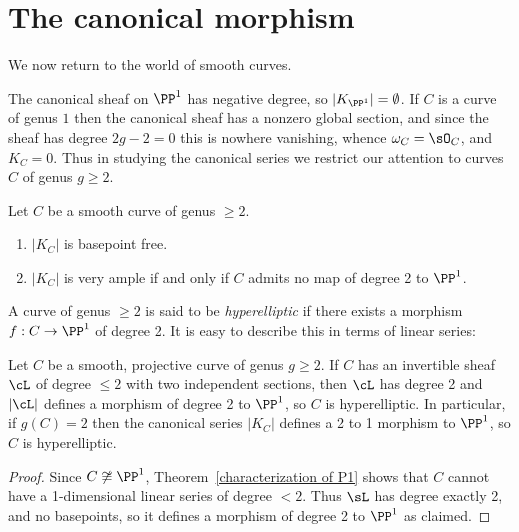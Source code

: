 \section{The canonical morphism}

We now return to the world of smooth curves.

 The canonical sheaf on $\PP^1$ has negative degree, so $|K_{\PP^1}| = \emptyset$. If $C$ is a curve
 of genus $1$ then the canonical sheaf     has a nonzero global section, and since the sheaf has degree $2g-2=0$ this is nowhere vanishing, whence
 $\omega_C = \sO_C$, and $K_C = 0$. Thus in studying the canonical series we restrict our attention to curves $C$ of genus $g\geq 2$. 
 
 \begin{theorem}\label{canonical series is very ample} Let $C$ be a smooth curve of genus $\geq 2$.
\begin{enumerate}
 \item $|K_C|$ is basepoint free.
 \item $|K_C|$ is very ample if and only if $C$ admits no map of degree 2 to $\PP^1$.
\end{enumerate}
\end{theorem}

A curve of genus $\geq 2$
is said to be \emph{hyperelliptic} if there exists a morphism $f: C \to \PP^1$ of degree 2. 
It is easy to describe this in terms of linear series:

\begin{lemma}\label{deg 2 morphism}
Let $C$ be a smooth, projective curve of genus $g\geq 2$. If $C$ has an invertible sheaf $\cL$ of degree $\leq 2$ with two independent sections, then $\cL$ has degree 2 and
$|\cL|$ defines a morphism of degree 2 to $\PP^{1}$, so $C$ is hyperelliptic. In particular, if $g(C) = 2$ then the canonical series $|K_{C}|$ defines a 2 to 1 morphism to $\PP^{1}$, so $C$ is hyperelliptic.
\end{lemma}

\begin{proof}
Since $C \not\cong \PP^1$,  Theorem~\ref{characterization of P1} shows that $C$ cannot have a 1-dimensional linear series
of degree $< 2$. Thus $\sL$ has degree exactly 2, and no basepoints, so it defines a morphism of degree 2 to $\PP^1$ as claimed.
\end{proof}

